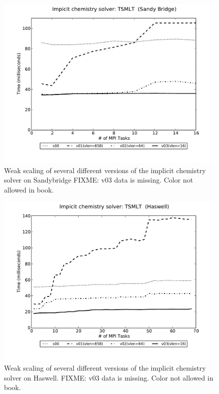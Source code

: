 \begin{figure}[tbp]
 \begin{center}
\includegraphics[width=12.0cm]{figures/chem-snb.pdf}
\end{center}
\caption{Weak scaling of several different versions of the implicit chemistry solver on Sandybridge {\color{red} FIXME: v03 data is missing. Color not allowed in book.}}
\label{fig:chem-weak-snb}
\end{figure}

\begin{figure}[tbp]
 \begin{center}
\includegraphics[width=12.0cm]{figures/chem-hsw.pdf}
\end{center}
\caption{Weak scaling of several different versions of the implicit chemistry solver on Haswell. {\color{red} FIXME:  v03 data is missing. Color not allowed in book.}}
\label{fig:chem-weak-haswell}
\end{figure}

